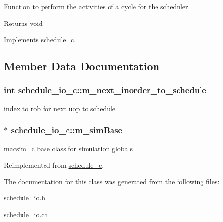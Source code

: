 Function to perform the activities of a cycle for the scheduler. 

\begin{DoxyReturn}{Returns}
void 
\end{DoxyReturn}


Implements \hyperlink{classschedule__c_abaede0d6b5e70e5cfc6bf98801e387e1}{schedule\_\-c}.



\subsection{Member Data Documentation}
\hypertarget{classschedule__io__c_a5bf81c5205db201ff80eb9d99da075a3}{
\subsubsection[{m\_\-next\_\-inorder\_\-to\_\-schedule}]{\setlength{\rightskip}{0pt plus 5cm}int {\bf schedule\_\-io\_\-c::m\_\-next\_\-inorder\_\-to\_\-schedule}}}
\label{classschedule__io__c_a5bf81c5205db201ff80eb9d99da075a3}
index to rob for next uop to schedule \hypertarget{classschedule__io__c_a4fd792581e727219c93a1d4ac6707cbd}{
\subsubsection[{m\_\-simBase}]{$\ast$ {\bf schedule\_\-io\_\-c::m\_\-simBase}}}
\label{classschedule__io__c_a4fd792581e727219c93a1d4ac6707cbd}
\hyperlink{classmacsim__c}{macsim\_\-c} base class for simulation globals 

Reimplemented from \hyperlink{classschedule__c_a0db71234050b2c33f454b5d65d458564}{schedule\_\-c}.



The documentation for this class was generated from the following files:\begin{DoxyCompactItemize}
\item 
schedule\_\-io.h\item 
schedule\_\-io.cc\end{DoxyCompactItemize}

